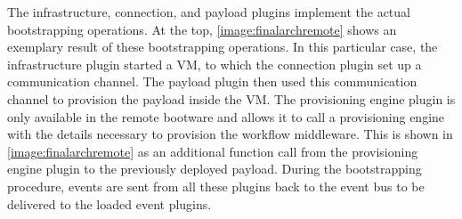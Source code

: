 The infrastructure, connection, and payload plugins implement the actual bootstrapping operations.
At the top, \autoref{image:finalarchremote} shows an exemplary result of these bootstrapping operations.
In this particular case, the infrastructure plugin started a VM, to which the connection plugin set up a communication channel.
The payload plugin then used this communication channel to provision the payload inside the VM.
The provisioning engine plugin is only available in the remote bootware and allows it to call a provisioning engine with the details necessary to provision the workflow middleware.
This is shown in \autoref{image:finalarchremote} as an additional function call from the provisioning engine plugin to the previously deployed payload.
During the bootstrapping procedure, events are sent from all these plugins back to the event bus to be delivered to the loaded event plugins.
